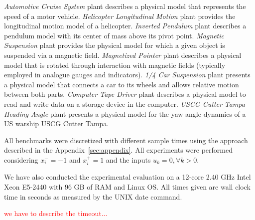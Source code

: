 \documentclass[runningheads,a4paper]{llncs}
\begin{document}
\textit{Automotive Cruise System} plant describes a physical model that represents 
the speed of a motor vehicle. 
\textit{Helicopter Longitudinal Motion} plant provides the 
longitudinal motion model of a helicopter. 
\textit{Inverted Pendulum} plant describes a pendulum model
with its center of mass above its pivot point. 
\textit{Magnetic Suspension} plant provides the physical model for which 
a given object is suspended via a magnetic field. 
\textit{Magnetized Pointer} plant describes a physical model that is rotated through interaction 
with magnetic fields (typically employed in analogue gauges and indicators).
\textit{1/4 Car Suspension} plant presents a physical model that connects a car to its wheels 
and allows relative motion between both parts.
\textit{Computer Tape Driver} plant describes a physical model to read and write data 
on a storage device in the computer.
\textit{USCG Cutter Tampa Heading Angle} plant presents a physical model 
for the yaw angle dynamics of a US warship USCG Cutter Tampa.

All benchmarks were discretized with different sample times using 
the approach described in the Appendix~\ref{sec:appendix}. 
All experiments were performed considering $x_{i}^{-}=-1$ and 
$x_{i}^{+}=1$ and the inputs $u_{k}=0, \forall k>0$.

We have also conducted the experimental evaluation on a 12-core 2.40 GHz
Intel Xeon E5-2440 with 96 GB of RAM and Linux OS. All times given are wall 
clock time in seconds as measured by the UNIX date command. 

\textcolor{red}{we have to describe the timeout...}
\end{document}
